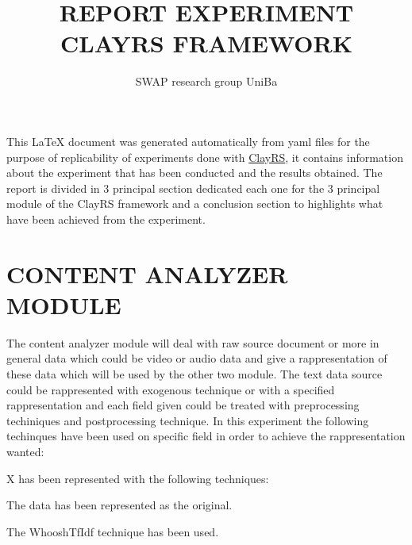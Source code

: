 \documentclass[11pt]{article}
\title{REPORT EXPERIMENT CLAYRS FRAMEWORK}
\author{SWAP research group UniBa}
\begin{document}
\maketitle
This \LaTeX{} document was generated automatically from yaml files for the purpose of replicability of experiments done with
\href{https://github.com/swapUniba/ClayRS}{ClayRS},
it contains information about the experiment that has been conducted and the results obtained.
The report is divided in 3 principal section dedicated each one for the 3 principal module of the ClayRS framework
and a conclusion section to highlights what have been achieved from the experiment.
\hfill\break
\hfill\break



\section{CONTENT ANALYZER MODULE}\label{sec:ca}
The content analyzer module will deal with raw source document or more in general data which could be
video or audio data and give a rappresentation of these data which will be used by the other two module.
The text data source could be rappresented with exogenous technique or with a specified rappresentation
and each field given could be treated with preprocessing techiniques and postprocessing technique. In
this experiment the following techinques have been used on specific field in order to achieve the
rappresentation wanted:
\hfill\break
\hfill\break




X has been represented with the following techniques:
\hfill\break
\hfill\break


The data has been represented as the original.
\hfill\break
\hfill\break
{}


The WhooshTfIdf technique has been used.
\hfill\break
\hfill\break
{}
\end{document}
